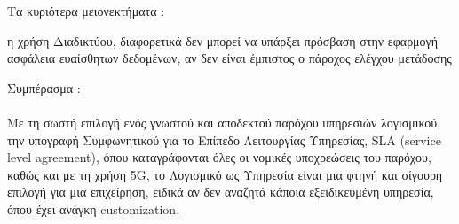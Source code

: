 \documentclass{article}
\begin{document}
\newpage
Τα κυριότερα μειονεκτήματα :
\begin{itemize}
  η χρήση Διαδικτύου, διαφορετικά δεν μπορεί να υπάρξει πρόσβαση στην εφαρμογή
 ασφάλεια ευαίσθητων δεδομένων, αν δεν είναι έμπιστος ο πάροχος
 ελέγχου
 μετάδοσης
\end{itemize}
Συμπέρασμα : \\ \\
Με τη σωστή επιλογή ενός γνωστού και αποδεκτού παρόχου υπηρεσιών λογισμικού, την υπογραφή Συμφωνητικού για το Επίπεδο Λειτουργίας Υπηρεσίας, SLA (service level agreement), όπου καταγράφονται όλες οι νομικές υποχρεώσεις του παρόχου, καθώς και με τη χρήση  5G, το Λογισμικό ως Υπηρεσία είναι μια φτηνή και σίγουρη επιλογή για μια επιχείρηση, ειδικά αν δεν αναζητά κάποια εξειδικευμένη υπηρεσία, όπου έχει ανάγκη  customization.


\newpage
\end{document}
